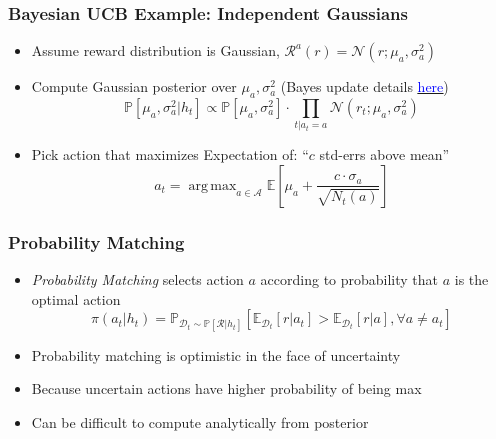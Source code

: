 \documentclass[handout]{beamer}
\DeclareMathOperator*{\argmax}{arg\,max}
\begin{document}
\begin{frame}
\frametitle{Bayesian UCB Example: Independent Gaussians}
\pause
\begin{itemize}[<+->]
\item Assume reward distribution is Gaussian, $\mathcal{R}^a(r) =\mathcal{N}(r;\mu_a, \sigma_a^2)$
\item Compute Gaussian posterior over $\mu_a,\sigma_a^2$  (Bayes update details \href{https://people.eecs.berkeley.edu/~jordan/courses/260-spring10/lectures/lecture5.pdf}{\underline{\textcolor{blue}{here}}})
$$\mathbb{P}[\mu_a, \sigma_a^2|h_t] \propto \mathbb{P}[\mu_a, \sigma_a^2] \cdot \prod_{t|a_t=a} \mathcal{N}(r_t;\mu_a, \sigma_a^2)$$
\item Pick action that maximizes Expectation of:  ``$c$ std-errs above mean''
$$a_t = \argmax_{a\in\mathcal{A}} \mathbb{E}[\mu_a + \frac {c \cdot \sigma_a} {\sqrt{N_t(a)}}]$$
\end{itemize}
\end{frame}


\begin{frame}
\frametitle{Probability Matching}
\pause
\begin{itemize}[<+->]
\item {\em Probability Matching} selects action $a$ according to probability that $a$ is the optimal action
$$\pi(a_t|h_t) = \mathbb{P}_{\mathcal{D}_t\sim \mathbb{P}[\mathcal{R}|h_t]}[\mathbb{E}_{\mathcal{D}_t}[r|a_t] > \mathbb{E}_{\mathcal{D}_t}[r|a], \forall a \neq a_t]$$
\item Probability matching is optimistic in the face of uncertainty
\item Because uncertain actions have higher probability of being max
\item Can be difficult to compute analytically from posterior
\end{itemize}
\end{frame}
\end{document}
